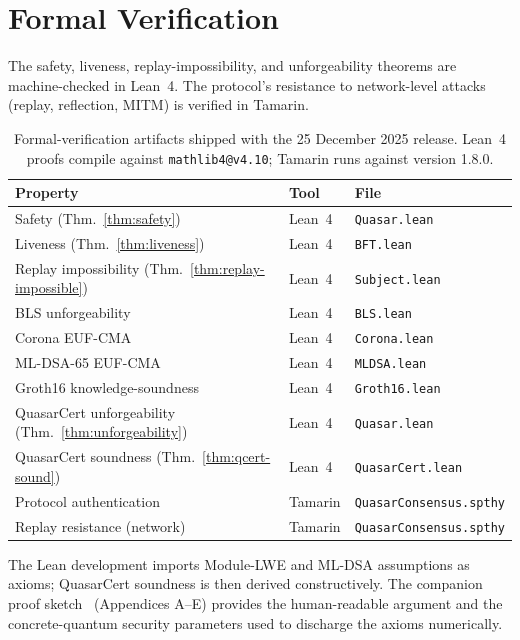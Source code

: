 \section{Formal Verification}

\label{sec:formal}

The safety, liveness, replay-impossibility, and unforgeability theorems
are machine-checked in Lean~4. The protocol's resistance to network-level
attacks (replay, reflection, MITM) is verified in Tamarin.

\begin{table}[ht]
\centering
\small
\begin{tabular}{@{}lll@{}}
\toprule
\textbf{Property} & \textbf{Tool} & \textbf{File} \\
\midrule
Safety (Thm.~\ref{thm:safety})        & Lean~4  & \texttt{Quasar.lean} \\
Liveness (Thm.~\ref{thm:liveness})    & Lean~4  & \texttt{BFT.lean} \\
Replay impossibility (Thm.~\ref{thm:replay-impossible})
                                       & Lean~4  & \texttt{Subject.lean} \\
BLS unforgeability                     & Lean~4  & \texttt{BLS.lean} \\
Corona EUF-CMA                       & Lean~4  & \texttt{Corona.lean} \\
ML-DSA-65 EUF-CMA                      & Lean~4  & \texttt{MLDSA.lean} \\
Groth16 knowledge-soundness            & Lean~4  & \texttt{Groth16.lean} \\
QuasarCert unforgeability (Thm.~\ref{thm:unforgeability})
                                       & Lean~4  & \texttt{Quasar.lean} \\
QuasarCert soundness (Thm.~\ref{thm:qcert-sound})
                                       & Lean~4  & \texttt{QuasarCert.lean} \\
Protocol authentication                & Tamarin & \texttt{QuasarConsensus.spthy} \\
Replay resistance (network)            & Tamarin & \texttt{QuasarConsensus.spthy} \\
\bottomrule
\end{tabular}
\caption{Formal-verification artifacts shipped with the 25 December 2025
release. Lean~4 proofs compile against \texttt{mathlib4@v4.10}; Tamarin
runs against version 1.8.0.}
\label{tab:formal}
\end{table}

The Lean development imports Module-LWE and ML-DSA assumptions as
axioms; QuasarCert soundness is then derived constructively. The
companion proof sketch~\cite{qcert-proof} (Appendices A--E) provides
the human-readable argument and the concrete-quantum security
parameters used to discharge the axioms numerically.


